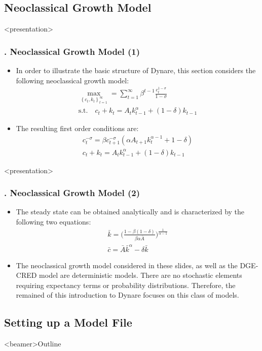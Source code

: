 \documentclass[11pt,aspectratio=169]{beamer}
\begin{document}
\subsection{Neoclassical Growth Model}
\begin{frame}<presentation>
\frametitle{{\thesection.\thesubsection} Neoclassical Growth Model (1)}
	 \begin{itemize}
	 	\item In order to illustrate the basic structure of Dynare, this section considers the following neoclassical growth model:
	 	\begin{gather*}
	 	\underset{\left\{ c_t, k_t\right\} _{t=1}^{\infty}}{\max} = \sum_{t=1}^{\infty} \beta^{t-1} \frac{c_t^{1-\sigma}}{1-\sigma}\\
	 	\text{s.t.} \quad c_t + k_t = A_t k_{t-1}^{\alpha} + (1-\delta) k_{t-1}
	 	\end{gather*}
	 	\item The resulting first order conditions are:
	 	\begin{gather*}
	 	c_t^{-\sigma} = \beta c_{t+1}^{-\sigma} (\alpha A_{t+1} k_t^{\alpha -1} + 1 - \delta)\\
	 	c_t + k_t = A_t k_{t-1}^\alpha + (1-\delta) k_{t-1}
	 	\end{gather*}
	\end{itemize}
\end{frame}
\begin{frame}<presentation>
	\frametitle{{\thesection.\thesubsection} Neoclassical Growth Model (2)}
	\begin{itemize}
		\justifying
		\item The steady state can be obtained analytically and is characterized by the following two equations:
		\begin{gather*}
		\bar{k} = \bigg(\frac{1-\beta (1-\delta)}{\beta\alpha\bar{A}}\bigg)^\frac{1}{\alpha -1}\\
		\bar{c} = \bar{A} \bar{k}^\alpha - \delta \bar{k}		
		\end{gather*}
		\item The neoclassical growth model considered in these slides, as well as the DGE-CRED model are deterministic models. There are no stochastic elements requiring expectancy terms or probability distributions. Therefore, the remained of this introduction to Dynare focuses on this class of models.
	\end{itemize}
\end{frame}

\subsection{Setting up a Model File}
\begin{frame}<beamer>{Outline}
	\tableofcontents[sectionstyle=hide/hide, subsectionstyle=show/shaded/hide, subsubsectionstyle=show/show/hide]
\end{frame}
\end{document}
